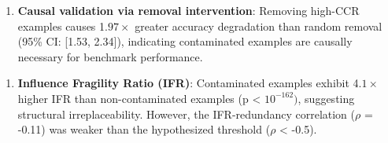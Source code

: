 \begin{enumerate}
\item \textbf{Causal validation via removal intervention}: Removing high-CCR examples causes 1.$97\times$ greater accuracy degradation than random removal (95\% CI: [1.53, 2.34]), indicating contaminated examples are causally necessary for benchmark performance.
\end{enumerate}

\begin{enumerate}
\item \textbf{Influence Fragility Ratio (IFR)}: Contaminated examples exhibit 4.$1\times$ higher IFR than non-contaminated examples (p < $10^{-162})$, suggesting structural irreplaceability. However, the IFR-redundancy correlation ($\rho$ = -0.11) was weaker than the hypothesized threshold ($\rho$ < -0.5).
\end{enumerate}

